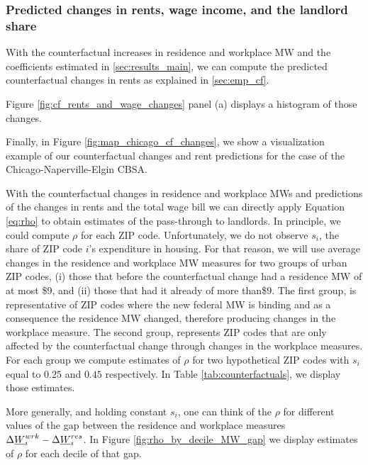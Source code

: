 \subsubsection*{Predicted changes in rents, wage income, and the landlord share}
\label{sec:cf_rents_and_wage_changes}

With the counterfactual increases in residence and workplace MW and the 
coefficients estimated in \ref{sec:results_main}, we can compute the predicted 
counterfactual changes in rents as explained in \ref{sec:emp_cf}.


Figure \ref{fig:cf_rents_and_wage_changes} panel (a) displays a histogram of 
those changes. 



Finally, in Figure \ref{fig:map_chicago_cf_changes}, we show a visualization example 
of our counterfactual changes and rent predictions for the case of the 
Chicago-Naperville-Elgin CBSA. 


With the counterfactual changes in residence and workplace MWs and predictions of 
the changes in rents and the total wage bill we can directly apply Equation \ref{eq:rho} 
to obtain estimates of the pass-through to landlords. In principle, we could compute $\rho$ 
for each ZIP code. Unfortunately, we do not observe $s_i$, the share of ZIP code $i$'s 
expenditure in housing. For that reason, we will use average changes in the residence and 
workplace MW measures for two groups of urban ZIP codes, (i) those that before the counterfactual 
change had a residence MW of at most \$9, and (ii) those that had it already of more than\$9. The 
first group, is representative of ZIP codes where the new federal MW is binding and as a consequence 
the residence MW changed, therefore producing changes in the workplace measure. The second group, 
represents ZIP codes that are only affected by the counterfactual change through changes in the 
workplace measures.
For each group we compute estimates of $\rho$ for two hypothetical ZIP codes with $s_i$ equal to 
$0.25$ and $0.45$ respectively. In Table \ref{tab:counterfactuals}, we display those estimates.


More generally, and holding constant $s_i$, one can think of the $\rho$ for different values
of the gap between the residence and workplace measures $\Delta \underline{W}_i^{wrk} - \Delta \underline{W}_i^{res}$.
In Figure \ref{fig:rho_by_decile_MW_gap} we display estimates of $\rho$ for each decile of that gap.



